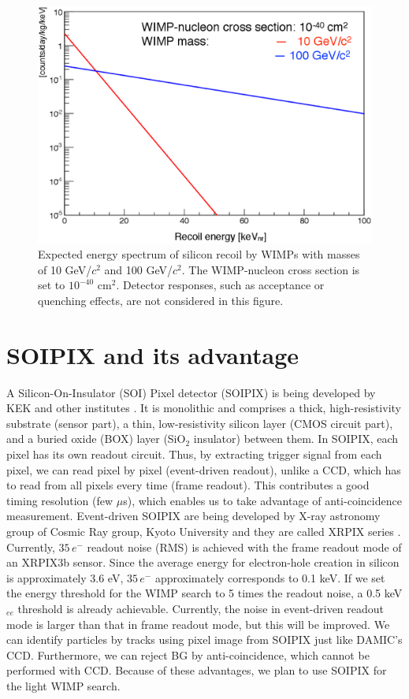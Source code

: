 \documentclass[12pt]{article}
\begin{document}
\begin{figure}[htb]
\centering
\includegraphics[height=8 cm]{recoil.eps}
\caption{Expected energy spectrum of silicon recoil by WIMPs with masses of 10 GeV/$c^2$ and 100 GeV/$c^2$.  The WIMP-nucleon cross section is set to $10^{-40}$ cm$^2$. Detector responses, such as acceptance or quenching effects, are not considered in this figure.}
\label{fig:Sirecoil}
\end{figure}



\section{SOIPIX and its advantage}
A Silicon-On-Insulator (SOI) Pixel detector (SOIPIX) is being developed by KEK and other institutes \cite{Arai:2011ara}.  It is monolithic and comprises a thick, high-resistivity substrate (sensor part), a thin, low-resistivity silicon layer (CMOS circuit part), and a buried oxide (BOX) layer (SiO$_2$ insulator) between them.  In SOIPIX, each pixel has its own readout circuit. Thus, by extracting trigger signal from each pixel, we can read pixel by pixel (event-driven readout), unlike a CCD, which has to read from all pixels every time (frame readout).  This contributes a good timing resolution (few $\mu$s), which enables us to take advantage of anti-coincidence measurement.  Event-driven SOIPIX are being developed by X-ray astronomy group of Cosmic Ray group, Kyoto University and they are called XRPIX series \cite{Tsuru:2014jfa,Takeda:2014tza}. Currently, $35\, e^-$ readout noise (RMS) is achieved with the frame readout mode of an XRPIX3b sensor\cite{Takeda:JINST}.  Since the average energy for electron-hole creation in silicon is approximately 3.6 eV, $35\, e^-$ approximately corresponds to 0.1 keV.  If we set the energy threshold for the WIMP search to 5 times the readout noise, a 0.5 keV$_{ee}$ threshold is already achievable. Currently, the noise in event-driven readout mode is larger than that in frame readout mode, but this will be improved.  We can identify particles by tracks using pixel image from SOIPIX just like DAMIC's CCD. Furthermore, we can reject BG by anti-coincidence, which cannot be performed with CCD.  Because of these advantages, we plan to use SOIPIX for the light WIMP search.
\end{document}
